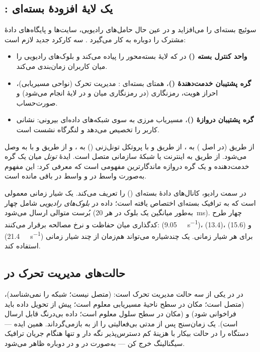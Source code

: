 \documentclass[11pt,a4paper]{article}
\begin{document}
\subsection{: یک لایهٔ افزودهٔ بسته‌ای}
 سوئیچ بسته‌ای را می‌افزاید و در عین حال حامل‌های رادیویی، سایت‌ها و پایگاه‌های
دادهٔ مشترک  را دوباره به کار می‌گیرد \cite{ts23060}. سه کارکرد جدید لازم است:
\begin{itemize}
  \item \textbf{واحد کنترل بسته ()} در  که لایهٔ بسته‌محور
         را پیاده می‌کند و بلوک‌های رادیویی را میان کاربران زمان‌بندی می‌کند.
  \item \textbf{گره پشتیبان خدمت‌دهندهٔ  ()}، همتای بسته‌ای :
        مدیریت تحرک (نواحی مسیریابی)، احراز هویت، رمزنگاری (در  رمزنگاری میان
         و  در لایهٔ  انجام می‌شود) و صورت‌حساب.
  \item \textbf{گره پشتیبان دروازهٔ  ()}، مسیریاب مرزی به سوی
        شبکه‌های داده‌ای بیرونی: نشانی  کاربر را تخصیص می‌دهد و لنگرگاه نشست است.
\end{itemize}
 از طریق  (در اصل ) به ، از طریق 
و با پروتکل تونل‌زنی  () به ، و از طریق  و با
 به  وصل می‌شود.  از طریق  به اینترنت یا شبکهٔ
سازمانی متصل است. ایدهٔ \emph{تونل} میان یک گره خدمت‌دهنده و یک گره دروازه ماندگارترین
مفهومی است که  معرفی کرد: این مفهوم به‌صورت واسط  در  و
واسط  در  باقی مانده است.

در سمت رادیو،  کانال‌های دادهٔ بسته‌ای () را تعریف می‌کند. 
یک شیار زمانی معمولی است که به ترافیک بسته‌ای اختصاص یافته است؛ داده در \emph{بلوک‌های
رادیویی} شامل چهار بُرست متوالی ارسال می‌شود (به‌طور میانگین یک بلوک در هر
\qty{20}{\milli\second}). چهار طرح کدگذاری میان حفاظت و نرخ مصالحه برقرار می‌کنند:
 (\qty{9.05}{\kilo\bit\per\second})،  (13.4)،  (15.6) و 
(\qty{21.4}{\kilo\bit\per\second}) برای هر شیار زمانی. یک  چندشیاره می‌تواند
هم‌زمان از چند شیار زمانی استفاده کند.

\subsection{حالت‌های مدیریت تحرک در }
 در  در یکی از سه حالت مدیریت تحرک است:
\textbf{} (متصل نیست؛ شبکه  را نمی‌شناسد)،
\textbf{} (متصل است؛ مکان در سطح ناحیهٔ مسیریابی معلوم است؛ پیش از تحویل
داده باید فراخوانی شود) و \textbf{} (مکان در سطح سلول معلوم است؛ داده بی‌درنگ
قابل ارسال است). یک زمان‌سنج پس از مدتی بی‌فعالیتی  را از  به
 بازمی‌گرداند. همین ایده --- دستگاه را در حالت بیکار با هزینهٔ کم دسترس‌پذیر
نگه دار و تنها هنگام جریان ترافیک سیگنالینگ خرج کن --- به‌صورت 
در  و  در  دوباره ظاهر می‌شود.
\end{document}
